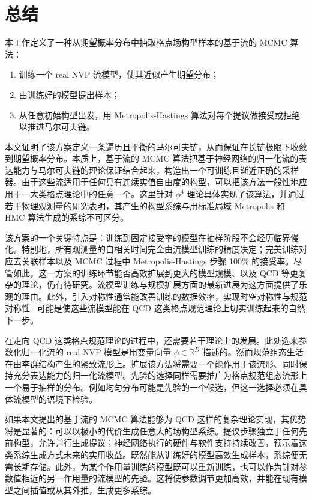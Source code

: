 \section{总结}
\label{sec:summary}

本工作定义了一种从期望概率分布中抽取格点场构型样本的基于流的 MCMC 算法：
\begin{enumerate}
    \item 训练一个 real NVP 流模型，使其近似产生期望分布；
    \item 由训练好的模型提出样本；
    \item 从任意初始构型出发，用 Metropolis-Hastings 算法对每个提议做接受或拒绝以推进马尔可夫链。
\end{enumerate}
本文证明了该方案定义一条遍历且平衡的马尔可夫链，从而保证在长链极限下收敛到期望概率分布。本质上，基于流的 MCMC 算法把基于神经网络的归一化流的表达能力与马尔可夫链的理论保证结合起来，构造出一个可训练且渐近正确的采样器。由于这些流适用于任何具有连续实值自由度的构型，可以把该方法一般性地应用于一大类格点理论中的任意一个。这里针对 $\phi^4$ 理论具体实现了该算法，并通过若干物理观测量的研究表明，其产生的构型系综与用标准局域 Metropolis 和 HMC 算法生成的系综不可区分。

该方案的一个关键特点是：训练到固定接受率的模型在抽样阶段不会经历临界慢化。特别地，所有观测量的自相关时间完全由流模型训练的精度决定；完美训练对应去关联样本以及 MCMC 过程中 Metropolis-Hastings 步骤 100\% 的接受率。尽管如此，这一方案的训练环节能否高效扩展到更大的模型规模、以及 QCD 等更复杂的理论，仍有待研究。流模型训练与规模扩展方面的最新进展为这方面提供了乐观的理由。此外，引入对称性通常能改善训练的数据效率，实现时空对称性与规范对称性~\cite{Cohen2019GaugeEquiv} 可能是使这些流模型能在 QCD 这类格点规范理论上切实训练起来的自然下一步。

在走向 QCD 这类格点规范理论的过程中，还需要若干理论上的发展。此处选来参数化归一化流的 real NVP 模型是用变量向量 $\phi \in \mathbb{R}^D$ 描述的。然而规范组态生活在由李群结构产生的紧致流形上。扩展该方法将需要一个能作用于该流形、同时保持充分表达能力的归一化流模型。先验的选择同样需要推广为格点规范组态流形上一个易于抽样的分布。例如均匀分布可能是先验的一个候选，但这一选择必须在具体流模型的语境下检验。

如果本文提出的基于流的 MCMC 算法能够为 QCD 这样的复杂理论实现，其优势将是显著的：可以以极小的代价生成任意大的场构型系综。提议步骤独立于任何先前构型，允许并行生成提议；神经网络执行的硬件与软件支持持续改善，预示着这类系综生成方式未来的实用收益。既然能从训练好的模型高效生成样本，系综便无需长期存储。此外，为某个作用量训练的模型既可以重新训练，也可以作为针对参数值相近的另一作用量的流模型的先验。这将使参数调节更加高效，并能在现有模型之间插值或从其外推，生成更多系综。
